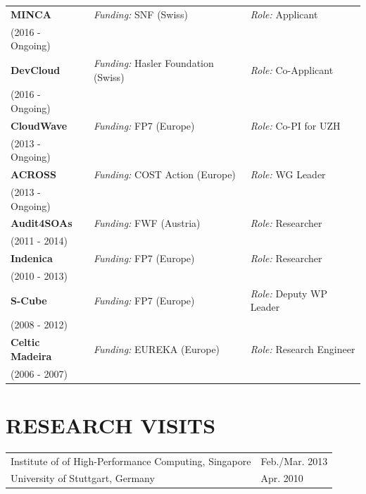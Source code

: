 \documentclass[paper=letter,fontsize=11pt]{scrartcl} %
\newcommand{\NewPart}[2]{\section*{\uppercase{#1} #2}}
\begin{document}
  \begin{tabular}{p{4.8cm}ll}
      \textbf{MINCA} & \emph{Funding:} SNF (Swiss) & \emph{Role:} Applicant \\
    (2016 - Ongoing) & & \\
    \textbf{DevCloud} & \emph{Funding:} Hasler Foundation (Swiss) & \emph{Role:} Co-Applicant \\
    (2016 - Ongoing) & & \\
    \textbf{CloudWave} & \emph{Funding:} FP7 (Europe) & \emph{Role:} Co-PI for UZH \\
    (2013 - Ongoing) & & \\
    \textbf{ACROSS}  & \emph{Funding:} COST Action (Europe) & \emph{Role:} WG Leader  \\
    (2013 - Ongoing) & & \\
    \textbf{Audit4SOAs}  & \emph{Funding:} FWF (Austria) & \emph{Role:} Researcher \\
    (2011 - 2014) & & \\
    \textbf{Indenica}  & \emph{Funding:} FP7 (Europe) & \emph{Role:} Researcher \\
    (2010 - 2013) & & \\
    \textbf{S-Cube} & \emph{Funding:} FP7 (Europe) & \emph{Role:} Deputy WP Leader\\
    (2008 - 2012) & & \\
    \textbf{Celtic Madeira}  & \emph{Funding:} EUREKA (Europe) & \emph{Role:} Research Engineer\\
    (2006 - 2007) & & \\
  \end{tabular}

\NewPart{Research Visits}{}

  \begin{tabular}{p{12cm}l}
    Institute of of High-Performance Computing, Singapore & Feb./Mar. 2013 \\
    University of Stuttgart, Germany & Apr. 2010 \\
  \end{tabular}

%
%
\end{document}
